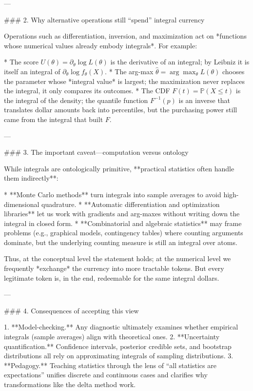 ---

### 2.  Why alternative operations still “spend” integral currency

Operations such as differentiation, inversion, and maximization act on *functions whose numerical values already embody integrals*.  For example:

* The score $U(\theta)=\partial_\theta \log L(\theta)$ is the derivative of an integral; by Leibniz it is itself an integral of $\partial_\theta \log f_\theta(X)$.
* The arg-max $\hat\theta=\arg\max_\theta L(\theta)$ chooses the parameter whose *integral value* is largest; the maximization never replaces the integral, it only compares its outcomes.
* The CDF $F(t)=\mathbb P(X\le t)$ is the integral of the density; the quantile function $F^{-1}(p)$ is an inverse that translates dollar amounts back into percentiles, but the purchasing power still came from the integral that built $F$.

---

### 3.  The important caveat—computation versus ontology

While integrals are ontologically primitive, **practical statistics often handle them indirectly**:

* **Monte Carlo methods** turn integrals into sample averages to avoid high-dimensional quadrature.
* **Automatic differentiation and optimization libraries** let us work with gradients and arg-maxes without writing down the integral in closed form.
* **Combinatorial and algebraic statistics** may frame problems (e.g., graphical models, contingency tables) where counting arguments dominate, but the underlying counting measure is still an integral over atoms.

Thus, at the conceptual level the statement holds; at the numerical level we frequently *exchange* the currency into more tractable tokens.  But every legitimate token is, in the end, redeemable for the same integral dollars.

---

### 4.  Consequences of accepting this view

1. **Model-checking.**  Any diagnostic ultimately examines whether empirical integrals (sample averages) align with theoretical ones.
2. **Uncertainty quantification.**  Confidence intervals, posterior credible sets, and bootstrap distributions all rely on approximating integrals of sampling distributions.
3. **Pedagogy.**  Teaching statistics through the lens of “all statistics are expectations” unifies discrete and continuous cases and clarifies why transformations like the delta method work.

